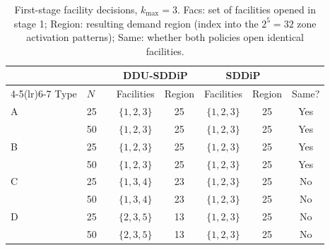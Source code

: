 \begin{table}[ht]
\centering
\caption{First-stage facility decisions, $k_{\max}=3$. Facs: set of facilities opened in stage 1; Region: resulting demand region (index into the $2^5=32$ zone activation patterns); Same: whether both policies open identical facilities.}
\label{tab:policy_k3}
\small
\begin{tabular}{llr cc cc c}
\toprule
 & & & \multicolumn{2}{c}{DDU-SDDiP} & \multicolumn{2}{c}{SDDiP} & \\
\cmidrule(lr){4-5}\cmidrule(lr){6-7}
Type & $N$ & & Facilities & Region & Facilities & Region & Same? \\
\midrule
A & 25 & & $\{1,2,3\}$ & 25 & $\{1,2,3\}$ & 25 & Yes \\
 & 50 & & $\{1,2,3\}$ & 25 & $\{1,2,3\}$ & 25 & Yes \\
\midrule
B & 25 & & $\{1,2,3\}$ & 25 & $\{1,2,3\}$ & 25 & Yes \\
 & 50 & & $\{1,2,3\}$ & 25 & $\{1,2,3\}$ & 25 & Yes \\
\midrule
C & 25 & & $\{1,3,4\}$ & 23 & $\{1,2,3\}$ & 25 & No \\
 & 50 & & $\{1,3,4\}$ & 23 & $\{1,2,3\}$ & 25 & No \\
\midrule
D & 25 & & $\{2,3,5\}$ & 13 & $\{1,2,3\}$ & 25 & No \\
 & 50 & & $\{2,3,5\}$ & 13 & $\{1,2,3\}$ & 25 & No \\
\bottomrule
\end{tabular}
\end{table}